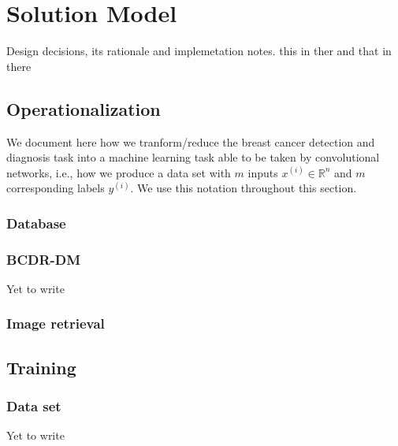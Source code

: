 \chapter{Solution Model}
\label{ch:Model}

Design decisions, its rationale and implemetation notes. this in ther and that in there

\section{Operationalization}
We document here how we tranform/reduce the breast cancer detection and diagnosis task into a machine learning task able to be taken by convolutional networks, i.e., how we produce a data set with $m$ inputs $x^{(i)} \in \mathbb{R}^n$ and $m$ corresponding labels $y^{(i)}$. We use this notation throughout this section. 

	\subsection{Database}
	

	\subsection{BCDR-DM}
	Yet to write
	
	\subsection{Image retrieval}
	

\section{Training}

	\subsection{Data set}
	Yet to write

